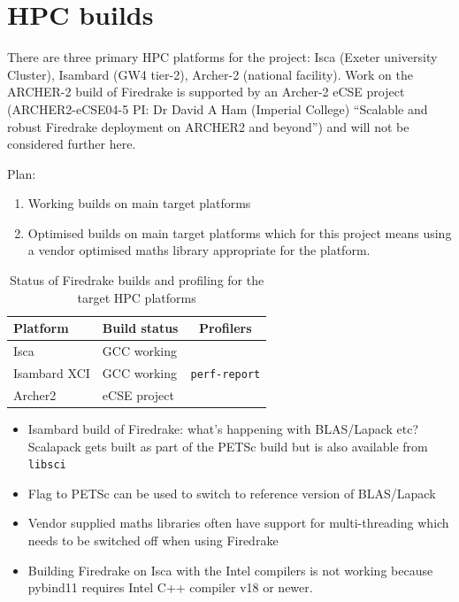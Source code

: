 \documentclass[a4paper,titlepage]{article}
\begin{document}

\section{HPC builds}

There are three primary HPC platforms for the project: Isca (Exeter university Cluster), Isambard (GW4 tier-2), Archer-2 (national facility). Work on the ARCHER-2 build of Firedrake is supported by an Archer-2 eCSE project (ARCHER2-eCSE04-5 PI: Dr David A Ham (Imperial College) ``Scalable and robust Firedrake deployment on ARCHER2 and beyond'') and will not be considered further here. 

Plan:
\begin{enumerate}
\item Working builds on main target platforms
\item Optimised builds on main target platforms which for this project means using a vendor optimised maths library appropriate for the platform.
\end{enumerate}
%
\begin{table}[htp]
\begin{center}
\begin{tabular}{|l|l|c|}
\hline
Platform       &  Build status   & Profilers           \\
\hline
Isca           &  GCC working    & \\
Isambard XCI   &  GCC working    & \texttt{perf-report} \\
Archer2        &  eCSE project   & \\
\hline
\end{tabular}
\end{center}
\caption{Status of Firedrake builds and profiling for the target HPC platforms}
\label{table:build_status}
\end{table}%

\begin{itemize}
\item Isambard build of Firedrake: what's happening with BLAS/Lapack etc? Scalapack gets built as part of the PETSc build but is also available from \texttt{libsci}
\item Flag to PETSc can be used to switch to reference version of BLAS/Lapack
\item Vendor supplied maths libraries often have support for multi-threading which needs to be switched off when using Firedrake
\item Building Firedrake on Isca with the Intel compilers is not working because pybind11 requires Intel C++ compiler v18 or newer.
\end{itemize}
\end{document}
